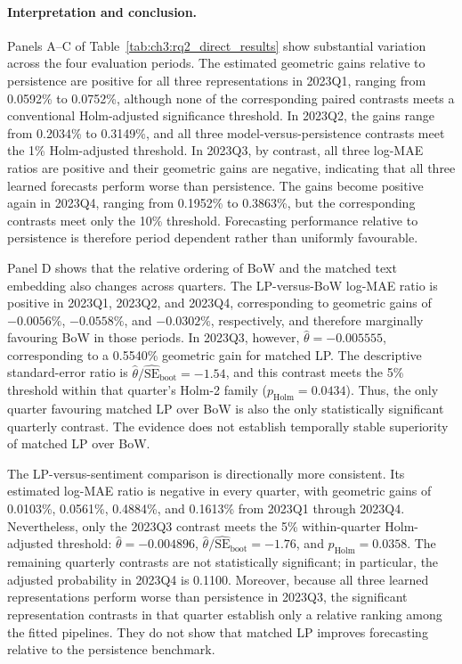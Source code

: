 \paragraph*{Interpretation and conclusion.}
Panels A--C of Table~\ref{tab:ch3:rq2_direct_results} show substantial
variation across the four evaluation periods. The estimated geometric gains
relative to persistence are positive for all three representations in
2023Q1, ranging from 0.0592\% to 0.0752\%, although none of the corresponding
paired contrasts meets a conventional Holm-adjusted significance threshold.
In 2023Q2, the gains range from 0.2034\% to 0.3149\%, and all three
model-versus-persistence contrasts meet the 1\% Holm-adjusted threshold. In
2023Q3, by contrast, all three log-MAE ratios are positive and their geometric
gains are negative, indicating that all three learned forecasts perform worse
than persistence. The gains become positive again in 2023Q4, ranging from
0.1952\% to 0.3863\%, but the corresponding contrasts meet only the 10\%
threshold. Forecasting performance relative to persistence is therefore
period dependent rather than uniformly favourable.

Panel D shows that the relative ordering of BoW and the matched text embedding
also changes across quarters. The LP-versus-BoW log-MAE ratio is positive in
2023Q1, 2023Q2, and 2023Q4, corresponding to geometric gains of
$-0.0056\%$, $-0.0558\%$, and $-0.0302\%$, respectively, and therefore
marginally favouring BoW in those periods. In 2023Q3, however,
$\widehat{\theta}=-0.005555$, corresponding to a 0.5540\% geometric gain for
matched LP. The descriptive standard-error ratio is
$\widehat{\theta}/\widehat{\mathrm{SE}}_{\mathrm{boot}}=-1.54$, and this
contrast meets the 5\% threshold within that quarter's Holm-2 family
($p_{\mathrm{Holm}}=0.0434$). Thus, the only quarter favouring matched LP over
BoW is also the only statistically significant quarterly contrast. The
evidence does not establish temporally stable superiority of matched LP over
BoW.

The LP-versus-sentiment comparison is directionally more consistent.
Its estimated log-MAE ratio is negative in every quarter, with geometric
gains of 0.0103\%, 0.0561\%, 0.4884\%, and 0.1613\% from 2023Q1 through
2023Q4. Nevertheless, only the 2023Q3 contrast meets the 5\% within-quarter
Holm-adjusted threshold:
$\widehat{\theta}=-0.004896$,
$\widehat{\theta}/\widehat{\mathrm{SE}}_{\mathrm{boot}}=-1.76$, and
$p_{\mathrm{Holm}}=0.0358$. The remaining quarterly contrasts are not
statistically significant; in particular, the adjusted probability in
2023Q4 is 0.1100. Moreover, because all three learned representations perform
worse than persistence in 2023Q3, the significant representation contrasts
in that quarter establish only a relative ranking among the fitted pipelines.
They do not show that matched LP improves forecasting relative to the
persistence benchmark.

